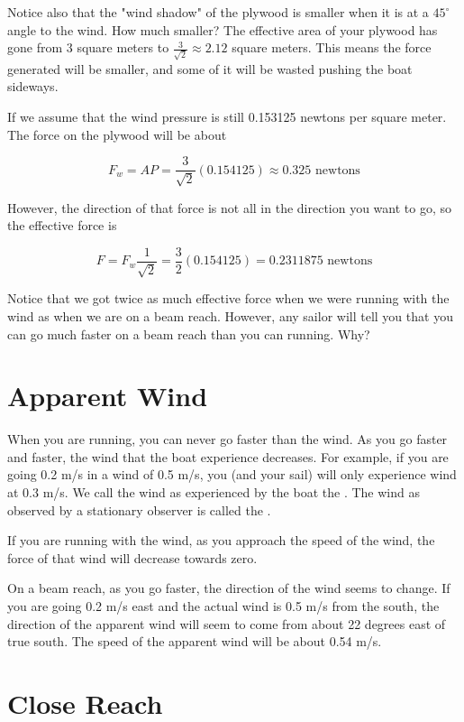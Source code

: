 Notice also that the "wind shadow" of the plywood is smaller when it is at a $45^\circ$ angle to the wind.  How much smaller?  The effective area of your plywood has
gone from 3 square meters to $\frac{3}{\sqrt{2}} \approx 2.12$ square meters. This means the force generated will be smaller, and some of it will be wasted pushing the boat sideways.

If we assume that the wind pressure is still 0.153125 newtons per square meter. The force on the plywood will be about

$$F_w = A P = \frac{3}{\sqrt{2}}(0.154125) \approx 0.325 \text{ newtons}$$

However, the direction of that force is not all in the direction you want to go, so the effective force is

$$F = F_w \frac{1}{\sqrt{2}} =  \frac{3}{2}(0.154125) = 0.2311875 \text{ newtons}$$

Notice that we got twice as much effective force when we were running with the wind as when we are on a beam reach.  However, any sailor will tell you that you can go much faster
on a beam reach than you can running. Why?
\section{Apparent Wind}

When you are running,  you can never go faster than the wind.   As you go faster and faster,  the wind that the boat experience decreases. For example, if you are going 0.2 m/s in a wind
of 0.5 m/s,  you (and your sail) will only experience wind at 0.3 m/s. We call the wind as experienced by the boat
the .  The wind as observed by a stationary observer is called the .

If you are running with the wind, as you approach the speed of the wind,  the force of that wind will decrease towards zero.

On a beam reach, as you go faster, the direction of the wind seems to change. If you are going 0.2 m/s east and the actual wind is 0.5 m/s from the south, the direction of the
apparent wind will seem to come from about 22 degrees east of true south.  The speed of the apparent wind will be about 0.54 m/s.

\section{Close Reach}

